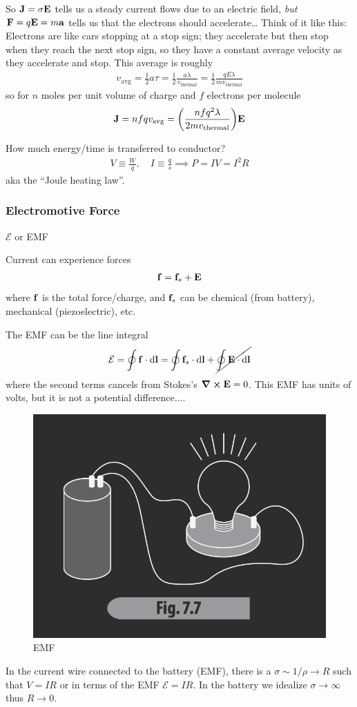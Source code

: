 \documentclass[../main.tex]{subfiles}
\begin{document}
So $\vb J = \sigma \vb E$ tells us a steady current flows due to an electric field, \emph{but}
$\vb F = q \vb E = m \vb a$ tells us that the electrons should accelerate\dots
Think of it like this: Electrons are like cars stopping at a stop sign;
they accelerate but then stop when they reach the next stop sign,
so they have a constant average velocity as they accelerate and stop.
This average is roughly
\begin{align*}
    v_\text{avg} = \frac{1}{2} a \tau = \frac{1}{2} \frac{a \lambda}{v_\text{thermal}} = \frac{1}{2} \frac{q E \lambda}{m v_\text{thermal}}
\end{align*}
so for $n$ moles per unit volume of charge and $f$ electrons per molecule
\begin{align*}
    \vb J = n fq v_\text{avg} = \qt(\frac{nf q^2 \lambda}{2m v_\text{thermal}}) \vb E
\end{align*}

How much energy/time is transferred to conductor?
\begin{align*}
    V \equiv \frac{W}{q}, \quad I \equiv \frac{q}{s} \implies P = IV = I^2 R
\end{align*}
aka the ``Joule heating law''.

\newpage
\subsubsection{Electromotive Force}

$\mathcal{E}$ or EMF

Current can experience forces
\begin{align*}
    \vb f = \vb f_s + \vb E
\end{align*}
where $\vb f$ is the total force/charge, and $\vb f_s$ can be chemical (from battery), mechanical (piezoelectric), etc.

The EMF can be the line integral
\begin{align*}
    \mathcal{E} = \oint \vb f \cdot \dd{\vb l} = \oint \vb f_s \cdot \dd{\vb l} + \cancel{\oint \vb E \cdot \dd{\vb l}}
\end{align*}
where the second terms cancels from Stokes's $\curl \vb E = 0$.
This EMF has units of volts, but it is not a potential difference....

\begin{figure}[ht]
    \centering
    \includegraphics[width=0.5\linewidth]{fig7_7.png}
    \caption{EMF}
    \label{fig:gr7_7}
\end{figure}
In the current wire connected to the battery (EMF), there is a $\sigma \sim 1/\rho \to R$ such that
$V = IR$ or in terms of the EMF $\mathcal{E} = IR$.
In the battery we idealize $\sigma \to \infty$ thus $R \to 0$. 
\end{document}
